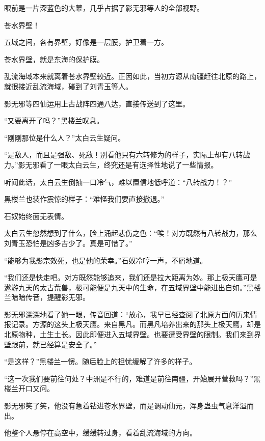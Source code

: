 
\begin{this_body}



眼前是一片深蓝色的大幕，几乎占据了影无邪等人的全部视野。

苍水界壁！

五域之间，各有界壁，好像是一层膜，护卫着一方。

苍水界壁，就是东海的保护膜。

乱流海域本来就离着苍水界壁较近。正因如此，当初方源从南疆赶往北原的路上，就很接近乱流海域，碰到了刘青玉等人。

影无邪等四仙运用上古战阵四通八达，直接传送到了这里。

“又要离开了吗？”黑楼兰叹息。

“刚刚那位是什么人？”太白云生疑问。

“是敌人，而且是强敌、死敌！别看他只有六转修为的样子，实际上却有八转战力。”影无邪看了一眼太白云生，终究还是有选择性地说了一些情报。

听闻此话，太白云生倒抽一口冷气，难以置信地低呼道：“八转战力！？”

黑楼兰也装作震惊的样子：“难怪我们要直接撤退。”

石奴始终面无表情。

太白云生忽然想到了什么，脸上涌起悲伤之色：“唉！对方既然有八转战力，那么刘青玉恐怕是凶多吉少了。真是可惜了。”

“能够为我影宗效死，也是他的荣幸。”石奴冷哼一声，不屑地道。

“我们还是快走吧。对方既然能够追来，我们还是拉大距离为妙。那上极天鹰可是遨游九天的太古荒兽，极可能便是九天中的生命，在五域界壁中能进出自如。”黑楼兰暗暗传音，提醒影无邪。

影无邪深深地看了她一眼，传音回道：“放心，我早已经查阅了北原方面的历来情报记录。方源的这头上极天鹰。来自黑凡。而黑凡培养出来的那头上极天鹰，却是北原物种，土生土长。因此即便进入五域界壁。也要遭受界壁的限制。我们来到界壁跟前，就已经算是安全了。”

“是这样？”黑楼兰一愣。随后脸上的担忧缓解了许多的样子。

“这一次我们要前往何处？中洲是不行的，难道是前往南疆，开始展开营救吗？”黑楼兰开口又问。

影无邪笑了笑，他没有急着钻进苍水界壁，而是调动仙元，浑身蛊虫气息洋溢而出。

他整个人悬停在高空中，缓缓转过身，看着乱流海域的方向。


\end{this_body}
